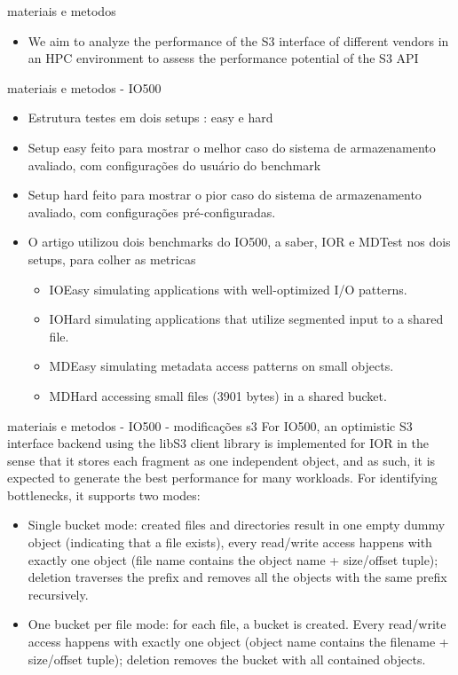 \documentclass{beamer}
\begin{document}
\begin{frame}{materiais e metodos}
    \begin{itemize}
        \item We aim to analyze the performance of the S3 interface of different vendors in an
HPC environment to assess the performance potential of the S3 API
    \end{itemize}
\end{frame}
\begin{frame}{materiais e metodos - IO500}
	\begin{itemize}
		\item Estrutura testes em dois setups : easy e hard
		\item Setup easy feito para mostrar o melhor caso do sistema de armazenamento avaliado, com configurações do usuário do benchmark
		\item Setup hard feito para mostrar o pior caso do sistema de armazenamento avaliado, com configurações pré-configuradas.
		\item O artigo utilizou dois benchmarks do IO500, a saber, IOR e MDTest nos dois setups, para colher as metricas
		\begin{itemize}
			\item IOEasy simulating applications with well-optimized I/O patterns.
			\item IOHard simulating applications that utilize segmented input to a shared file.
			\item MDEasy simulating metadata access patterns on small objects.
			\item MDHard accessing small files (3901 bytes) in a shared bucket.
		\end{itemize}
		\end{itemize}
	\end{frame}
 \begin{frame}{materiais e metodos - IO500 - modificações s3}
	For IO500, an optimistic S3 interface backend using the libS3 client library is implemented for IOR in the sense that it stores each fragment as one independent object, and as
	such, it is expected to generate the best performance for many workloads.
	For identifying bottlenecks, it supports two modes:
\begin{itemize}
	\item 	Single bucket mode: created files and directories result in one empty dummy object
	(indicating that a file exists), every read/write access happens with exactly one object
	(file name contains the object name + size/offset tuple); deletion traverses the prefix
	and removes all the objects with the same prefix recursively.
	\item	One bucket per file mode: for each file, a bucket is created. Every read/write access
	happens with exactly one object (object name contains the filename + size/offset
	tuple); deletion removes the bucket with all contained objects.
	
\end{itemize}
	
\end{frame}
\end{document}
